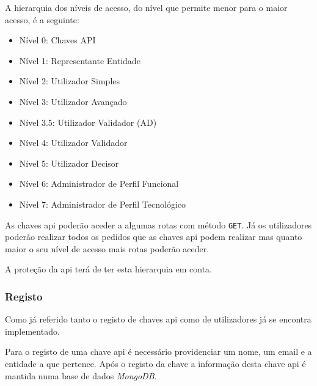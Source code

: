 A hierarquia dos níveis de acesso, do nível que permite menor para o maior acesso, é a seguinte:
\begin{itemize}
    \item Nível 0: Chaves API
    \item Nível 1: Representante Entidade
    \item Nível 2: Utilizador Simples
    \item Nível 3: Utilizador Avançado
    \item Nível 3.5: Utilizador Validador (AD)
    \item Nível 4: Utilizador Validador
    \item Nível 5: Utilizador Decisor
    \item Nível 6: Administrador de Perfil Funcional
    \item Nível 7: Administrador de Perfil Tecnológico
\end{itemize}

As chaves \acrshort{api} poderão aceder a algumas rotas com método \texttt{GET}.
Já os utilizadores poderão realizar todos os pedidos que as chaves \acrshort{api} podem realizar mas quanto maior o seu nível de acesso mais rotas poderão aceder.

A proteção da \acrshort{api} terá de ter esta hierarquia em conta.

\subsubsection{Registo}

Como já referido tanto o registo de chaves \acrshort{api} como de utilizadores já se encontra implementado.

Para o registo de uma chave \acrshort{api} é necessário providenciar um nome, um email e a entidade a que pertence. Após o registo da chave a informação desta chave \acrshort{api} é mantida numa base de dados \textit{MongoDB}.


